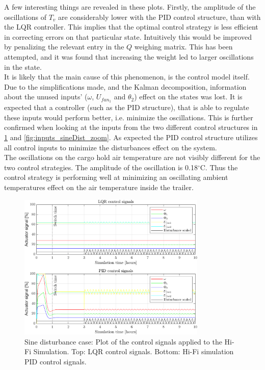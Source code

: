 \noindent A few interesting things are revealed in these plots. Firstly, the amplitude of the oscillations of $T_v$ are considerably lower with the PID control structure, than with the LQR controller. This implies that the optimal control strategy is less efficient in correcting errors on that particular state. Intuitively this would be improved by penalizing the relevant entry in the $Q$ weighing matrix. This has been attempted, and it was found that increasing the weight led to larger oscillations in the state.\\

It is likely that the main cause of this phenomenon, is the control model itself. Due to the simplifications made, and the Kalman decomposition, information about the unused inputs' ($\omega$, $U_{fan_1}$ and $\theta_2$) effect on the states was lost. It is expected that a controller (such as the PID structure), that is able to regulate these inputs would perform better, i.e. minimize the oscillations. This is further confirmed when looking at the inputs from the two different control structures in \cref{fig:inputs_sineDist} and \cref{fig:inputs_sineDist_zoom}. As expected the PID control structure utilizes all control inputs to minimize the disturbances effect on the system.\\

The oscillations on the cargo hold air temperature are not visibly different for the two control strategies. The amplitude of the oscillation is 0.18$^{\circ}$C. Thus the control strategy is performing well at minimizing an oscillating ambient temperatures effect on the air temperature inside the trailer.

\begin{figure}[H]
	\centering
	\includegraphics[width=0.8\textwidth]{Graphics/fig_inputs_sineDist.png}
	\caption{Sine disturbance case: Plot of the control signals applied to the Hi-Fi Simulation. Top: LQR control signals. Bottom: Hi-Fi simulation PID control signals.}
	\label{fig:inputs_sineDist}
\end{figure}

